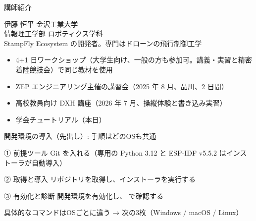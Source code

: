 \begin{frame}{講師紹介}
  \begin{block}{伊藤 恒平}
    \small 金沢工業大学\\
    情報理工学部 ロボティクス学科\\[3pt]
    StampFly Ecosystem の開発者。専門はドローンの飛行制御工学
  \end{block}

  \vspace{0.5em}

  \begin{itemize}\small
    \item 4+1 日ワークショップ（大学生向け、一般の方も参加可。講義・実習と精密着陸競技会）で同じ教材を使用
    \item ZEP エンジニアリング主催の講習会（2025 年 8 月、品川、2 日間）
    \item 高校教員向け DXH 講座（2026 年 7 月、操縦体験と書き込み実習）
    \item 学会チュートリアル（本日）
  \end{itemize}
\end{frame}

\begin{frame}{開発環境の導入（先出し）: 手順はどのOSも共通}
  \begin{exampleblock}{① 前提ツール}
    \small Git を入れる（専用の Python 3.12 と ESP-IDF v5.5.2 はインストーラが自動導入）
  \end{exampleblock}
  \begin{exampleblock}{② 取得と導入}
    \small リポジトリを取得し、インストーラを実行する
  \end{exampleblock}
  \begin{exampleblock}{③ 有効化と診断}
    \small 開発環境を有効化し、 で確認する
  \end{exampleblock}

  \vspace{0.3em}
  {\small 具体的なコマンドはOSごとに違う → 次の3枚（Windows / macOS / Linux）}
\end{frame}

